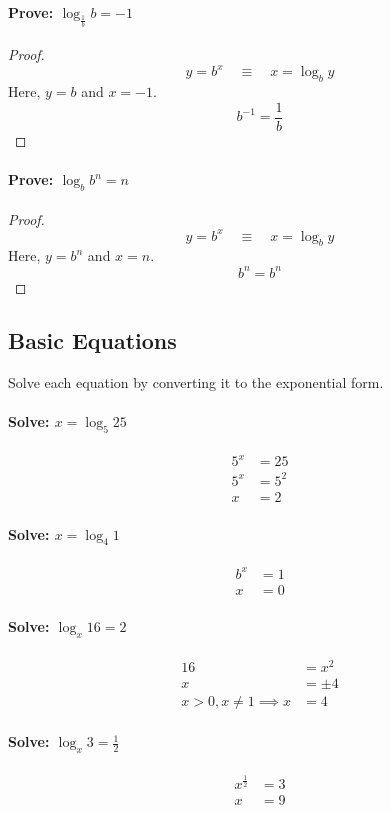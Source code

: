 			\paragraph{Prove: $\log_{\frac{1}{b}}b=-1$}
				\begin{proof}
					\[y=b^x \quad \equiv \quad x=\log_by\]
					Here, $y=b$ and $x=-1$.
					\[b^{-1} = \frac{1}{b}\]
				\end{proof}
			\paragraph{Prove: $\log_bb^n=n$}
				\begin{proof}
					\[y=b^x \quad \equiv \quad x=\log_by\]
					Here, $y=b^n$ and $x=n$.
					\[b^n = b^n\]
				\end{proof}
		\subsection{Basic Equations}
			Solve each equation by converting it to the exponential form.
			\paragraph{Solve: $x=\log_5 25$}
				\begin{align*}
					5^x &= 25\\
					5^x &= 5^2\\
					x &= 2
				\end{align*}
			\paragraph{Solve: $x=\log_4 1$}
				\begin{align*}
					b^x &= 1\\
					x &= 0
				\end{align*}
			\paragraph{Solve: $\log_x 16 = 2$}
				\begin{align*}
					16 &= x^2\\
					x &= \pm 4\\
					x > 0, x \neq 1 \implies x &= 4
				\end{align*}
			\paragraph{Solve: $\log_x 3 = \frac{1}{2}$}
				\begin{align*}
					x^{\frac{1}{2}} &= 3\\
					x &= 9
				\end{align*}
